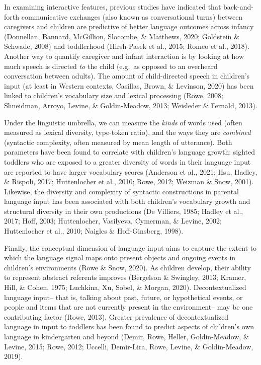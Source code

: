 \documentclass[
  man,floatsintext]{apa6}
\begin{document}
In examining interactive features, previous studies have indicated that back-and-forth communicative exchanges (also known as conversational turns) between caregivers and children are predictive of better language outcomes across infancy (Donnellan, Bannard, McGillion, Slocombe, \& Matthews, 2020; Goldstein \& Schwade, 2008) and toddlerhood (Hirsh-Pasek et al., 2015; Romeo et al., 2018). Another way to quantify caregiver and infant interaction is by looking at how much speech is directed \emph{to} the child (e.g.~as opposed to an overheard conversation between adults). The amount of child-directed speech in children's input (at least in Western contexts, Casillas, Brown, \& Levinson, 2020) has been linked to children's vocabulary size and lexical processing (Rowe, 2008; Shneidman, Arroyo, Levine, \& Goldin-Meadow, 2013; Weisleder \& Fernald, 2013).

Under the linguistic umbrella, we can measure the \emph{kinds} of words used (often measured as lexical diversity, type-token ratio), and the ways they are \emph{combined} (syntactic complexity, often measured by mean length of utterance). Both parameters have been found to correlate with children's language growth: sighted toddlers who are exposed to a greater diversity of words in their language input are reported to have larger vocabulary scores (Anderson et al., 2021; Hsu, Hadley, \& Rispoli, 2017; Huttenlocher et al., 2010; Rowe, 2012; Weizman \& Snow, 2001). Likewise, the diversity and complexity of syntactic constructions in parental language input has been associated with both children's vocabulary growth and structural diversity in their own productions (De Villiers, 1985; Hadley et al., 2017; Hoff, 2003; Huttenlocher, Vasilyeva, Cymerman, \& Levine, 2002; Huttenlocher et al., 2010; Naigles \& Hoff-Ginsberg, 1998).

Finally, the conceptual dimension of language input aims to capture the extent to which the language signal maps onto present objects and ongoing events in children's environments (Rowe \& Snow, 2020). As children develop, their ability to represent abstract referents improves (Bergelson \& Swingley, 2013; Kramer, Hill, \& Cohen, 1975; Luchkina, Xu, Sobel, \& Morgan, 2020). Decontextualized language input-- that is, talking about past, future, or hypothetical events, or people and items that are not currently present in the environment-- may be one contributing factor (Rowe, 2013). Greater prevalence of decontextualized language in input to toddlers has been found to predict aspects of children's own language in kindergarten and beyond (Demir, Rowe, Heller, Goldin-Meadow, \& Levine, 2015; Rowe, 2012; Uccelli, Demir-Lira, Rowe, Levine, \& Goldin-Meadow, 2019).
\end{document}
